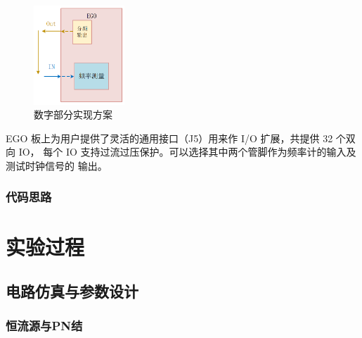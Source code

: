\documentclass[12pt,a4paper]{ctexart}
\begin{document}
\begin{figure}[H]
  \centering
  \includegraphics[width=3.4cm]{pic/2.2.1.png}
  \caption{数字部分实现方案}
\end{figure}
EGO 板上为用户提供了灵活的通用接口（J5）用来作 I/O 扩展，共提供 32 个双向 IO，
每个 IO 支持过流过压保护。可以选择其中两个管脚作为频率计的输入及测试时钟信号的
输出。

\subsubsection{代码思路}


\section{实验过程}
\subsection{电路仿真与参数设计}
\subsubsection{恒流源与PN结}
\end{document}
